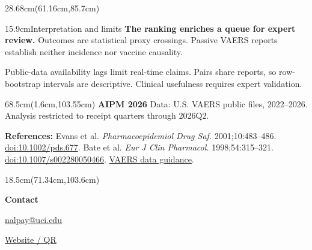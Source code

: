 \documentclass[12pt]{article}
\newcommand{\smallbody}{\fontsize{27}{35}\selectfont}
\newcommand{\spacepara}{\par\vspace{0.42cm}}
\begin{document}
\begin{textblock*}{28.68cm}(61.16cm,85.7cm)
\begin{posterbox}{15.9cm}{Interpretation and limits}
\smallbody
\textbf{The ranking enriches a queue for expert review.} Outcomes are statistical proxy crossings. Passive VAERS reports establish neither incidence nor vaccine causality.
\spacepara
Public-data availability lags limit real-time claims. Pairs share reports, so row-bootstrap intervals are descriptive. Clinical usefulness requires expert validation.
\end{posterbox}
\end{textblock*}

\begin{textblock*}{68.5cm}(1.6cm,103.55cm)
{\fontsize{24}{29}\selectfont\bfseries\color{Navy}AIPM 2026}\hspace{0.6cm}%
{\fontsize{21}{27}\selectfont\color{Muted}Data: U.S. VAERS public files, 2022--2026. Analysis restricted to receipt quarters through 2026Q2.}
\par\vspace{0.19cm}
{\fontsize{19}{25}\selectfont\color{Muted}
\textbf{References:} Evans et al. \emph{Pharmacoepidemiol Drug Saf.} 2001;10:483--486. \href{https://doi.org/10.1002/pds.677}{doi:10.1002/pds.677}.
Bate et al. \emph{Eur J Clin Pharmacol.} 1998;54:315--321. \href{https://doi.org/10.1007/s002280050466}{doi:10.1007/s002280050466}.
\href{https://vaers.hhs.gov/data/dataguide.html}{VAERS data guidance}.}
\end{textblock*}
\begin{textblock*}{18.5cm}(71.34cm,103.6cm)
\begin{minipage}[c]{14.7cm}
\raggedleft
{\fontsize{24}{29}\selectfont\color{Navy}\bfseries Contact}\par
{\fontsize{23}{28}\selectfont\href{mailto:nalpay@uci.edu}{nalpay@uci.edu}}\par
{\fontsize{19}{24}\selectfont\color{Muted}\href{https://alpaynatanael.github.io/index.html}{Website / QR}}
\end{minipage}\hfill
\begin{minipage}[c]{2.5cm}
\end{minipage}
\end{textblock*}
\null
\end{document}
